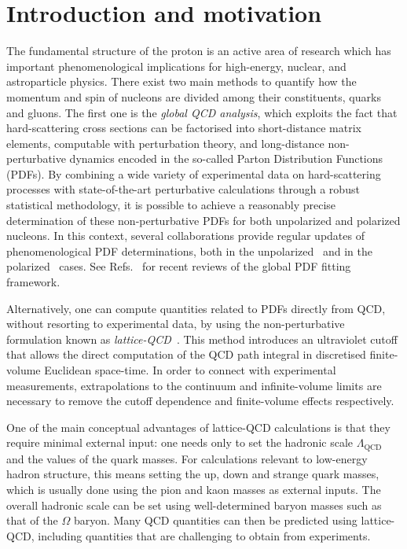 \section{Introduction and motivation}


The fundamental structure of the proton is an active area of research
which has important phenomenological implications for
high-energy, nuclear, and astroparticle physics.
%
There exist two main methods to quantify how the momentum and spin of
nucleons
are divided among their constituents, quarks and gluons.
%
The first one
is the {\it global QCD analysis}, which exploits the fact that hard-scattering
cross sections can be factorised into short-distance matrix elements,
computable with perturbation theory, and long-distance
non-perturbative dynamics encoded in the
so-called Parton Distribution Functions (PDFs).
%
By combining a wide variety of experimental data on hard-scattering processes
with state-of-the-art perturbative calculations through a robust statistical
methodology, it is possible to achieve a reasonably precise determination
of these non-perturbative PDFs for both unpolarized and polarized nucleons.
%
In this context, several collaborations provide regular updates of
phenomenological PDF determinations, both
in the unpolarized~\cite{Ball:2014uwa,Ball:2017nwa,Harland-Lang:2014zoa,
Dulat:2015mca,Alekhin:2017kpj,Accardi:2016qay} and in
the polarized~\cite{Nocera:2014gqa,deFlorian:2009vb,
  Sato:2016tuz,Hirai:2008aj} cases.
%
See Refs.~\cite{Perez:2012um,DeRoeck:2011na,Alekhin:2011sk,Ball:2012wy,
Forte:2013wc,Jimenez-Delgado:2013sma,Rojo:2015acz,Butterworth:2015oua,
Accardi:2016ndt,Gao:2017yyd}
for recent reviews of the global PDF fitting framework.

Alternatively, one can compute quantities related to PDFs directly 
from QCD, without resorting to
experimental data, by using the non-perturbative formulation known as
{\it lattice-QCD}~\cite{Olive:2016xmw,Gupta:1997nd}.
%
This method introduces an ultraviolet cutoff that allows the direct 
computation of the QCD path integral in discretised finite-volume 
Euclidean space-time.
%
In order to connect with experimental measurements, extrapolations to the 
continuum and infinite-volume limits are necessary to remove the  
cutoff dependence and finite-volume effects respectively.

One of the main
conceptual advantages of lattice-QCD calculations is that
they require minimal external input: one needs only to 
set the hadronic scale $\Lambda_\text{QCD}$ and the values of the quark masses.
%
For calculations relevant to low-energy hadron structure, this means
setting the up, down and strange quark masses,
which is usually done using the pion and kaon masses as external inputs.
%
The overall hadronic scale can be set using well-determined baryon masses 
such as that of the $\Omega$ baryon.
%
Many QCD quantities can then be predicted using lattice-QCD, including 
quantities that are challenging to obtain from experiments. 


